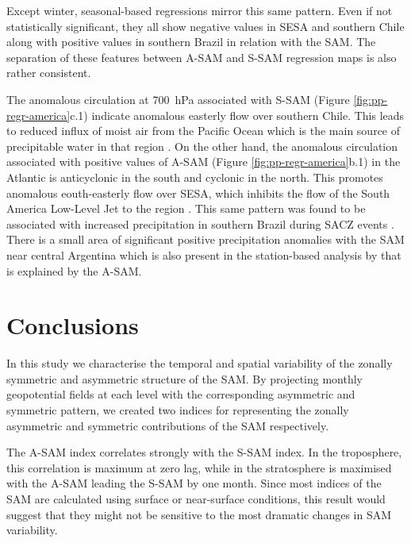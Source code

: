 \documentclass[smallextended]{svjour3}       %
\begin{document}
Except winter, seasonal-based regressions mirror this same pattern.
Even if not statistically significant, they all show negative values in SESA and southern Chile along with positive values in southern Brazil in relation with the SAM.
The separation of these features between A\nobreakdash-SAM and S\nobreakdash-SAM regression maps is also rather consistent.

The anomalous circulation at 700~hPa associated with S\nobreakdash-SAM (Figure \ref{fig:pp-regr-america}c.1) indicate anomalous easterly flow over southern Chile. This leads to reduced influx of moist air from the Pacific Ocean which is the main source of precipitable water in that region \citep[e.g.][]{garreaud2007}. On the other hand, the anomalous circulation associated with positive values of A\nobreakdash-SAM (Figure \ref{fig:pp-regr-america}b.1) in the Atlantic is anticyclonic in the south and cyclonic in the north. This promotes anomalous eouth-easterly flow over SESA, which inhibits the flow of the South America Low-Level Jet to the region \citep{silvestri2009, zamboni2010}. This same pattern was found to be associated with increased precipitation in southern Brazil during SACZ events \citep{rosso2018}.
There is a small area of significant positive precipitation anomalies with the SAM near central Argentina which is also present in the station-based analysis by \citet{gillett2006} that is explained by the A\nobreakdash-SAM.

\hypertarget{conclusions}{%
\section{Conclusions}\label{conclusions}}

In this study we characterise the temporal and spatial variability of the zonally symmetric and asymmetric structure of the SAM.
By projecting monthly geopotential fields at each level with the corresponding asymmetric and symmetric pattern, we created two indices for representing the zonally asymmetric and symmetric contributions of the SAM respectively.

The A\nobreakdash-SAM index correlates strongly with the S\nobreakdash-SAM index.
In the troposphere, this correlation is maximum at zero lag, while in the stratosphere is maximised with the A\nobreakdash-SAM leading the S\nobreakdash-SAM by one month.
Since most indices of the SAM are calculated using surface or near-surface conditions, this result would suggest that they might not be sensitive to the most dramatic changes in SAM variability.
\end{document}
